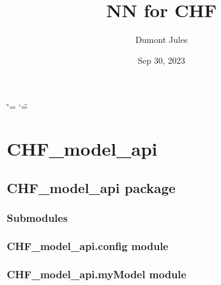 \documentclass[letterpaper,10pt,english]{sphinxmanual}
\title{NN for CHF}
\date{Sep 30, 2023}
\author{Dumont Jules}
\begin{document}
\ifdefined\shorthandoff
  \ifnum\catcode`\=\string=\active\shorthandoff{=}\fi
  \ifnum\catcode`\"=\active{}\fi
\fi

\pagestyle{empty}
\sphinxmaketitle
\pagestyle{plain}
\sphinxtableofcontents
\pagestyle{normal}
\label{\detokenize{index::doc}}


\sphinxstepscope


\chapter{CHF\_model\_api}
\label{\detokenize{modules:chf-model-api}}\label{\detokenize{modules::doc}}
\sphinxstepscope


\section{CHF\_model\_api package}
\label{\detokenize{CHF_model_api:chf-model-api-package}}\label{\detokenize{CHF_model_api::doc}}

\subsection{Submodules}
\label{\detokenize{CHF_model_api:submodules}}

\subsection{CHF\_model\_api.config module}
\label{\detokenize{CHF_model_api:module-CHF_model_api.config}}\label{\detokenize{CHF_model_api:chf-model-api-config-module}}

\subsection{CHF\_model\_api.myModel module}
\label{\detokenize{CHF_model_api:module-CHF_model_api.myModel}}\label{\detokenize{CHF_model_api:chf-model-api-mymodel-module}}
\end{document}
